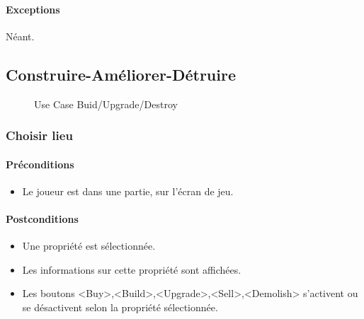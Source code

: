 \documentclass[a4paper,11pt]{report}
\begin{document}
\paragraph{Exceptions} Néant.

\newpage
\subsection{Construire-Améliorer-Détruire}
\begin{figure}[ht]
    \caption{Use Case Buid/Upgrade/Destroy}
\end{figure}

\subsubsection{Choisir lieu}
\paragraph{Préconditions}
\begin{itemize}
	\item Le joueur est dans une partie, sur l'écran de jeu.
\end{itemize}
\paragraph{Postconditions}
\begin{itemize}
	\item Une propriété est sélectionnée.
	\item Les informations sur cette propriété sont affichées.
	\item Les boutons <Buy>,<Build>,<Upgrade>,<Sell>,<Demolish> s'activent ou se désactivent selon la propriété sélectionnée.
\end{itemize}
\end{document}
